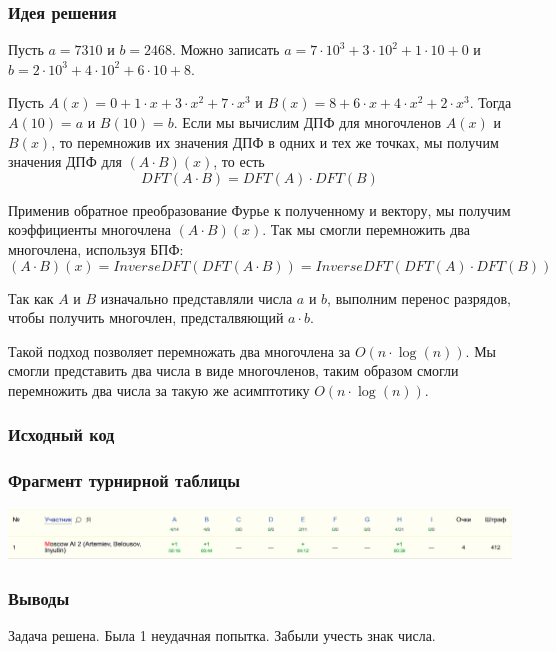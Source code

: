 
\subsubsection*{Идея решения}
Пусть $a = 7310$ и $b = 2468$. Можно записать $a = 7 \cdot 10 ^ 3 + 3 \cdot 10 ^ 2 + 1 \cdot 10 + 0$ и $b = 2 \cdot 10 ^ 3 + 4 \cdot 10 ^ 2 + 6 \cdot 10 + 8$.

Пусть $A(x) = 0 + 1 \cdot x + 3 \cdot x ^ 2 + 7 \cdot x ^ 3$ и $B(x) = 8 + 6 \cdot x + 4 \cdot x ^ 2 + 2 \cdot x ^ 3$. Тогда $A(10) = a$ и $B(10) = b$. Если мы вычислим ДПФ для многочленов $A(x)$ и $B(x)$, то перемножив их значения ДПФ в одних и тех же точках, мы получим значения ДПФ для $(A \cdot B) (x)$, то есть
$$DFT(A \cdot B) = DFT(A) \cdot DFT(B)$$

Применив обратное преобразование Фурье к полученному и вектору, мы получим коэффициенты многочлена $(A \cdot B) (x)$. Так мы смогли перемножить два многочлена, используя БПФ:
$$ (A \cdot B) (x) = InverseDFT(DFT(A \cdot B)) = InverseDFT(DFT(A) \cdot DFT(B)) $$

Так как $A$ и $B$ изначально представляли числа $a$ и $b$, выполним перенос разрядов, чтобы получить многочлен, предсталвяющий $a \cdot b$.

Такой подход позволяет перемножать два многочлена за $O(n \cdot \log(n))$. Мы смогли представить два числа в виде многочленов, таким образом смогли перемножить два числа за такую же асимптотику $O(n \cdot \log(n))$.
\subsubsection*{Исходный код}

\subsubsection*{Фрагмент турнирной таблицы}
\includegraphics[width=\textwidth]{images/220423.png}\newline\noindent
\subsubsection*{Выводы}
Задача решена. Была 1 неудачная попытка. Забыли учесть знак числа.
\pagebreak


